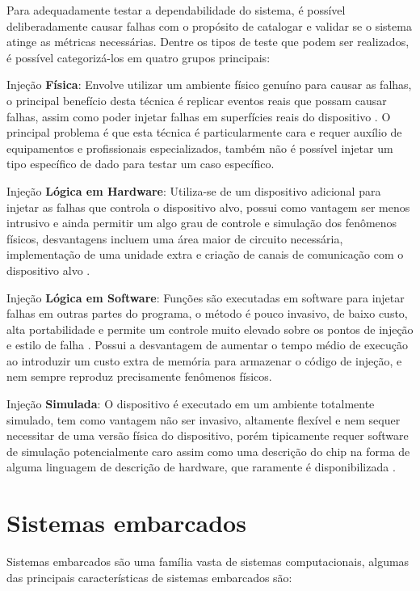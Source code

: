 Para adequadamente testar a dependabilidade do sistema, é possível deliberadamente causar falhas com o propósito de catalogar e validar se o sistema atinge as métricas necessárias. Dentre os tipos de teste que podem ser realizados, é possível categorizá-los em quatro grupos principais:

Injeção \textbf{Física}: Envolve utilizar um ambiente físico genuíno para causar as falhas, o principal benefício desta técnica é replicar eventos reais que possam causar falhas, assim como poder injetar falhas em superfícies reais do dispositivo \cite{FaultInjectionTechniques}. O principal problema é que esta técnica é particularmente cara e requer auxílio de equipamentos e profissionais especializados, também não é possível injetar um tipo específico de dado para testar um caso específico.

Injeção \textbf{Lógica em Hardware}: Utiliza-se de um dispositivo adicional para injetar as falhas que controla o dispositivo alvo, possui como vantagem ser menos intrusivo e ainda permitir um algo grau de controle e simulação dos fenômenos físicos, desvantagens incluem uma área maior de circuito necessária, implementação de uma unidade extra e criação de canais de comunicação com o dispositivo alvo \cite{FaultInjectionTechniques}.

Injeção \textbf{Lógica em Software}: Funções são executadas em software para injetar falhas em outras partes do programa, o método é pouco invasivo, de baixo custo, alta portabilidade e permite um controle muito elevado sobre os pontos de injeção e estilo de falha \cite{FaultInjectionTechniques}. Possui a desvantagem de aumentar o tempo médio de execução ao introduzir um custo extra de memória para armazenar o código de injeção, e nem sempre reproduz precisamente fenômenos físicos.

Injeção \textbf{Simulada}: O dispositivo é executado em um ambiente totalmente simulado, tem como vantagem não ser invasivo, altamente flexível e nem sequer necessitar de uma versão física do dispositivo, porém tipicamente requer software de simulação potencialmente caro assim como uma descrição do chip na forma de alguma linguagem de descrição de hardware, que raramente é disponibilizada \cite{FaultInjectionTechniques}.


\section{Sistemas embarcados}

Sistemas embarcados são uma família vasta de sistemas computacionais, algumas das principais características de sistemas embarcados são:

